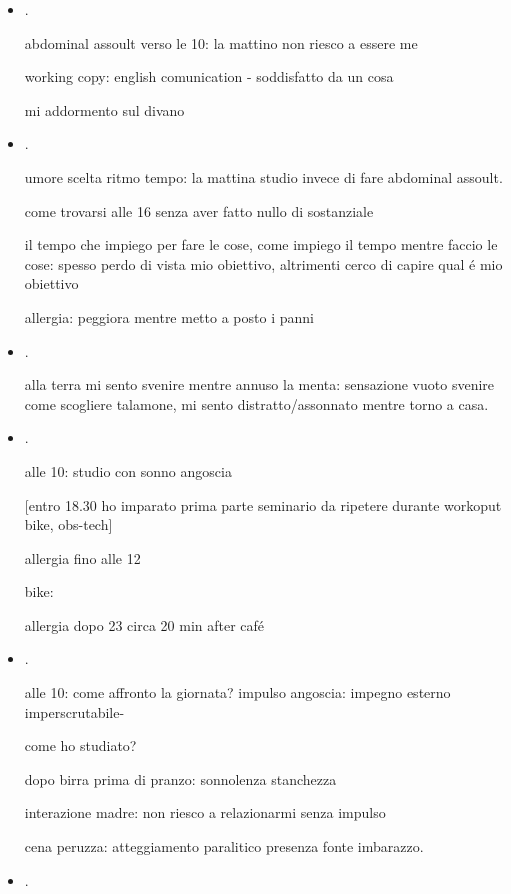 \begin{itemize}
\item {}.

abdominal assoult verso le 10: la mattino non riesco a essere me

working copy: english comunication - soddisfatto da un cosa

mi addormento sul divano

\item {}.

umore scelta ritmo tempo: la mattina studio invece di fare abdominal assoult.

come trovarsi alle 16 senza aver fatto nullo di sostanziale

il tempo che impiego per fare le cose, come impiego il tempo mentre faccio le cose: spesso perdo di vista mio obiettivo, altrimenti cerco di capire qual \'e mio obiettivo

allergia: peggiora mentre metto a posto i panni

\item {}.

alla terra mi sento svenire mentre annuso la menta: sensazione vuoto svenire come scogliere talamone, mi sento distratto/assonnato mentre torno a casa.

\item {}.

alle 10: studio con sonno angoscia

[entro 18.30 ho imparato prima parte seminario da ripetere durante workoput bike, obs-tech]

allergia fino alle 12

bike:

allergia dopo 23 circa 20 min after caf\'e

\item {}.

alle 10: come affronto la giornata? impulso  angoscia: impegno esterno imperscrutabile-

come ho studiato?

dopo birra prima di pranzo: sonnolenza stanchezza

interazione madre: non riesco a relazionarmi senza impulso

cena peruzza: atteggiamento paralitico presenza fonte imbarazzo.

\item {}.


\end{itemize}
